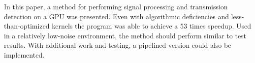 \documentclass[conference]{IEEEtran}
\begin{document}
In this paper, a method for performing signal processing and transmission
detection on a GPU was presented. Even with algorithmic deficiencies and
less-than-optimized kernels the program was able to achieve a 53 times
speedup. Used in a relatively low-noise environment, the method should
perform similar to test results. With additional work and testing, a
pipelined version could also be implemented. 

%
%



%
%
\end{document}
